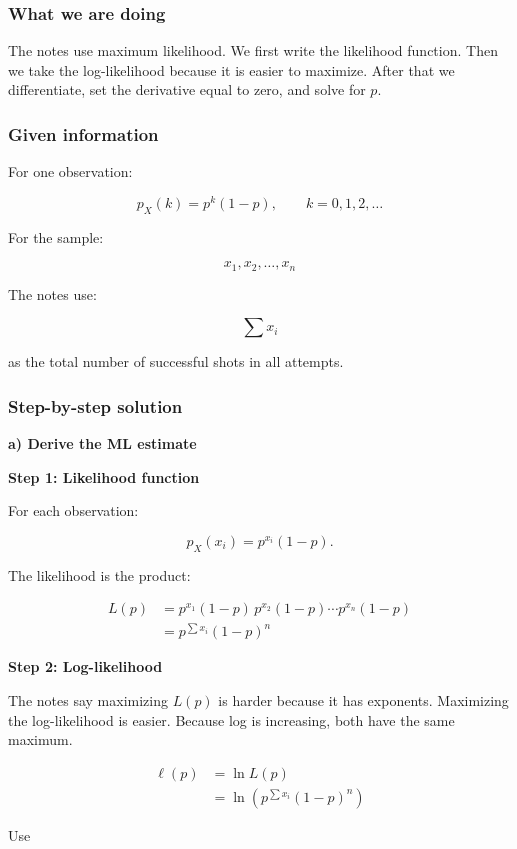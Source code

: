 \documentclass[10pt]{article}
\begin{document}
\subsubsection*{What we are doing}
The notes use maximum likelihood.
We first write the likelihood function.
Then we take the log-likelihood because it is easier to maximize.
After that we differentiate, set the derivative equal to zero,
and solve for $p$.

\subsubsection*{Given information}
For one observation:

\[
p_X(k)=p^k(1-p),
\qquad
k=0,1,2,\ldots
\]

For the sample:

\[
x_1,x_2,\ldots,x_n
\]

The notes use:

\[
\sum x_i
\]

as the total number of successful shots in all attempts.

\subsubsection*{Step-by-step solution}

\RepeatedQuestion{\uppgiftFiveQuestion}
\textbf{a) Derive the ML estimate}

\textbf{Step 1: Likelihood function}

For each observation:

\[
p_X(x_i)=p^{x_i}(1-p).
\]

The likelihood is the product:

\begin{align*}
L(p)
&=
p^{x_1}(1-p)\,
p^{x_2}(1-p)\cdots
p^{x_n}(1-p) \\[2mm]
&=
p^{\sum x_i}(1-p)^n
\end{align*}

\textbf{Step 2: Log-likelihood}

The notes say maximizing $L(p)$ is harder because it has exponents.
Maximizing the log-likelihood is easier.
Because log is increasing, both have the same maximum.

\begin{align*}
\ell(p)
&=
\ln L(p) \\[2mm]
&=
\ln\!\left(
p^{\sum x_i}(1-p)^n
\right)
\end{align*}

Use
\end{document}
